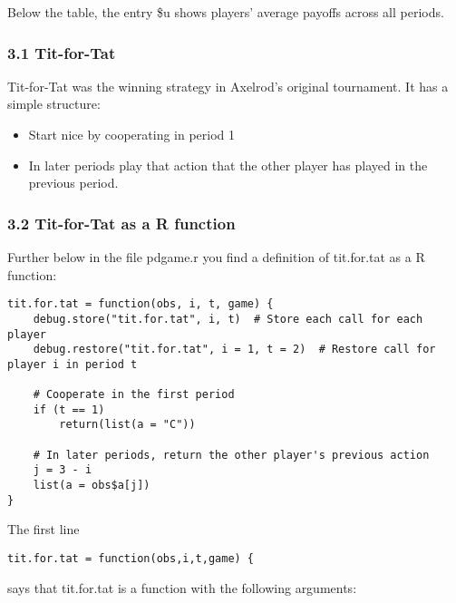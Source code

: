 \documentclass[]{article}
\begin{document}
Below the table, the entry \$u shows players' average payoffs across all
periods.

\subsubsection{3.1 Tit-for-Tat}

Tit-for-Tat was the winning strategy in Axelrod's original tournament.
It has a simple structure:

\begin{itemize}
\itemsep1pt\parskip0pt
\item
  Start nice by cooperating in period 1
\item
  In later periods play that action that the other player has played in
  the previous period.
\end{itemize}

\subsubsection{3.2 Tit-for-Tat as a R function}

Further below in the file pdgame.r you find a definition of tit.for.tat
as a R function:

\begin{verbatim}
tit.for.tat = function(obs, i, t, game) {
    debug.store("tit.for.tat", i, t)  # Store each call for each player
    debug.restore("tit.for.tat", i = 1, t = 2)  # Restore call for player i in period t

    # Cooperate in the first period
    if (t == 1) 
        return(list(a = "C"))

    # In later periods, return the other player's previous action
    j = 3 - i
    list(a = obs$a[j])
}
\end{verbatim}

The first line

\begin{verbatim}
tit.for.tat = function(obs,i,t,game) {
\end{verbatim}

says that tit.for.tat is a function with the following arguments:
\end{document}
